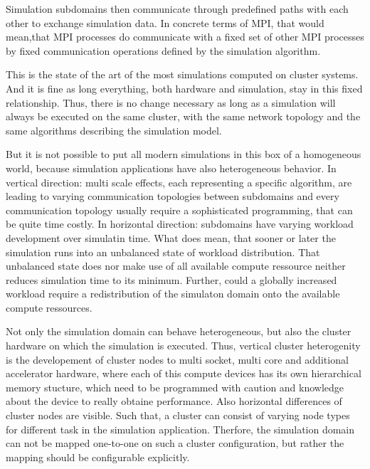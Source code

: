 
  Simulation subdomains then communicate through predefined paths with
  each other to exchange simulation data. In concrete terms of MPI,
  that would mean,that MPI processes do communicate with a fixed set
  of other MPI processes by fixed communication operations defined by
  the simulation algorithm.

  This is the state of the art of the most simulations computed on
  cluster systems. And it is fine as long everything, both hardware
  and simulation, stay in this fixed relationship. Thus, there is no
  change necessary as long as a simulation will always be
  executed on the same cluster, with the same network topology
  and the same algorithms describing the simulation model. 

  But it is not possible to put all modern simulations in this box of
  a homogeneous world, because simulation applications have also
  heterogeneous behavior.  In vertical direction: multi scale effects,
  each representing a specific algorithm, are leading to varying
  communication topologies between subdomains and every communication
  topology usually require a sophisticated programming, that can be
  quite time costly.  In horizontal direction: subdomains have varying
  workload development over simulatin time. What does mean, that
  sooner or later the simulation runs into an unbalanced state of
  workload distribution. That unbalanced state does nor make use of
  all available compute ressource neither reduces simulation time to
  its minimum. Further, could a globally increased workload require a
  redistribution of the simulaton domain onto the available compute
  ressources.

  Not only the simulation domain can behave heterogeneous, but also
  the cluster hardware on which the simulation is executed. Thus,
  vertical cluster heterogenity is the developement of cluster nodes
  to multi socket, multi core and additional accelerator hardware,
  where each of this compute devices has its own hierarchical memory
  stucture, which need to be programmed with caution and knowledge
  about the device to really obtaine performance.  Also horizontal
  differences of cluster nodes are visible. Such that, a cluster can
  consist of varying node types for different task in the simulation
  application. Therfore, the simulation domain can not be mapped
  one-to-one on such a cluster configuration, but rather the mapping
  should be configurable explicitly.

